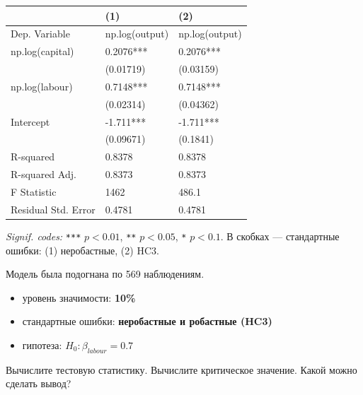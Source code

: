 \documentclass[
  russian,
]{article}
\newcounter{none} %
\providecommand{\tightlist}{%
  \setlength{\itemsep}{0pt}\setlength{\parskip}{0pt}}
\begin{document}
{\def\LTcaptype{none} %
\begin{longtable}[]{@{}lll@{}}
\toprule\noalign{}
& (1) & (2) \\
\midrule\noalign{}
\endhead
\bottomrule\noalign{}
\endlastfoot
Dep. Variable & np.log(output) & np.log(output) \\
np.log(capital) & 0.2076*** & 0.2076*** \\
& (0.01719) & (0.03159) \\
np.log(labour) & 0.7148*** & 0.7148*** \\
& (0.02314) & (0.04362) \\
Intercept & -1.711*** & -1.711*** \\
& (0.09671) & (0.1841) \\
R-squared & 0.8378 & 0.8378 \\
R-squared Adj. & 0.8373 & 0.8373 \\
F Statistic & 1462 & 486.1 \\
Residual Std. Error & 0.4781 & 0.4781 \\
\end{longtable}
}

\emph{Signif. codes:} \texttt{***} \(p<0.01\), \texttt{**} \(p<0.05\),
\texttt{*} \(p<0.1\). В скобках --- стандартные ошибки: (1) неробастные,
(2) HC3.

Модель была подогнана по 569 наблюдениям.

\begin{tcolorbox}[enhanced jigsaw, arc=.35mm, bottomrule=.15mm, bottomtitle=1mm, breakable, colback=white, colbacktitle=quarto-callout-important-color!10!white, colframe=quarto-callout-important-color-frame, coltitle=black, left=2mm, leftrule=.75mm, opacityback=0, opacitybacktitle=0.6, rightrule=.15mm, title=\textcolor{quarto-callout-important-color}{\faExclamation}\hspace{0.5em}{Условия теста}, titlerule=0mm, toprule=.15mm, toptitle=1mm]

\begin{itemize}
\tightlist
\item
  уровень значимости: \textbf{10\%}
\item
  стандартные ошибки: \textbf{неробастные и робастные (HC3)}
\item
  гипотеза: \(H_0:\beta_{labour}=0.7\)
\end{itemize}

\end{tcolorbox}

Вычислите тестовую статистику. Вычислите критическое значение. Какой
можно сделать вывод?
\end{document}
